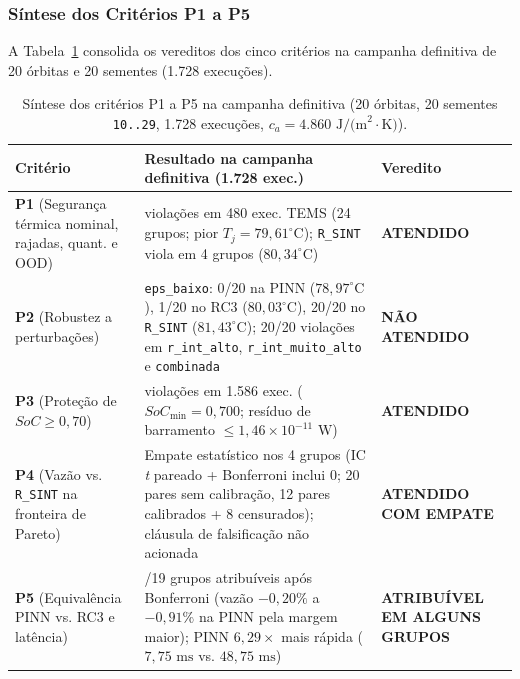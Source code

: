 \subsubsection{Síntese dos Critérios P1 a P5}

A Tabela~\ref{tab:marco5_veredito} consolida os vereditos dos cinco critérios na campanha definitiva de 20 órbitas e 20 sementes (1.728 execuções).

\begin{table}[htbp]
\centering
\small
\caption{Síntese dos critérios P1 a P5 na campanha definitiva (20 órbitas, 20 sementes \texttt{10..29}, 1.728 execuções, $c_a = 4.860\text{ J/(m}^2\cdot\text{K)}$).}
\label{tab:marco5_veredito}
\begin{tabularx}{\textwidth}{>{\raggedright\arraybackslash}p{3.0cm}>{\raggedright\arraybackslash}X>{\raggedright\arraybackslash}p{3.6cm}}
\toprule
\textbf{Critério} & \textbf{Resultado na campanha definitiva (1.728 exec.)} & \textbf{Veredito} \\
\midrule
\textbf{P1} (Segurança térmica nominal, rajadas, quant. e OOD) & 0 violações em 480 exec. TEMS (24 grupos; pior $T_j = 79{,}61^\circ\text{C}$); \texttt{R\_SINT} viola em 4 grupos ($80{,}34^\circ\text{C}$) & \textbf{ATENDIDO} \\
\addlinespace
\textbf{P2} (Robustez a perturbações) & \texttt{eps\_baixo}: 0/20 na PINN ($78{,}97^\circ\text{C}$), 1/20 no RC3 ($80{,}03^\circ\text{C}$), 20/20 no \texttt{R\_SINT} ($81{,}43^\circ\text{C}$); 20/20 violações em \texttt{r\_int\_alto}, \texttt{r\_int\_muito\_alto} e \texttt{combinada} & \textbf{NÃO ATENDIDO} \\
\addlinespace
\textbf{P3} (Proteção de $SoC \ge 0{,}70$) & 0 violações em 1.586 exec. ($SoC_{\min} = 0{,}700$; resíduo de barramento $\le 1{,}46 \times 10^{-11}\text{ W}$) & \textbf{ATENDIDO} \\
\addlinespace
\textbf{P4} (Vazão vs. \texttt{R\_SINT} na fronteira de Pareto) & Empate estatístico nos 4 grupos (IC \textit{t} pareado + Bonferroni inclui 0; 20 pares sem calibração, 12 pares calibrados + 8 censurados); cláusula de falsificação não acionada & \textbf{ATENDIDO COM EMPATE} \\
\addlinespace
\textbf{P5} (Equivalência PINN vs. RC3 e latência) & 8/19 grupos atribuíveis após Bonferroni (vazão $-0{,}20\%$ a $-0{,}91\%$ na PINN pela margem maior); PINN $6{,}29\times$ mais rápida ($7{,}75\text{ ms}$ vs. $48{,}75\text{ ms}$) & \textbf{ATRIBUÍVEL EM ALGUNS GRUPOS} \\
\bottomrule
\end{tabularx}
\end{table}

